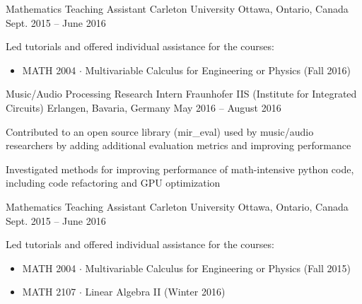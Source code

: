 

\begin{cventries}

    \cventry
      {Mathematics Teaching Assistant} %
      {Carleton University} %
      {Ottawa, Ontario, Canada} %
      {Sept. 2015 – June 2016} %
      {
        \begin{cvitems} %
          \item {Led tutorials and offered individual assistance for the courses:}
            \begin{itemize}
              \item {MATH 2004 $\cdot$ Multivariable Calculus for Engineering or Physics (Fall 2016)}
            \end{itemize}
        \end{cvitems}
      }

  \cventry
    {Music/Audio Processing Research Intern} %
    {Fraunhofer IIS (Institute for Integrated Circuits)} %
    {Erlangen, Bavaria, Germany} %
    {May 2016 – August 2016} %
    {
      \begin{cvitems} %
        \item {Contributed to an open source library (mir\_eval) used by music/audio researchers by adding additional evaluation metrics and improving performance}
        \item {Investigated methods for improving performance of math-intensive python code, including code refactoring and GPU optimization}
      \end{cvitems}
    }

  \cventry
    {Mathematics Teaching Assistant} %
    {Carleton University} %
    {Ottawa, Ontario, Canada} %
    {Sept. 2015 – June 2016} %
    {
      \begin{cvitems} %
        \item {Led tutorials and offered individual assistance for the courses:}
          \begin{itemize}
            \item {MATH 2004 $\cdot$ Multivariable Calculus for Engineering or Physics (Fall 2015)}
            \item {MATH 2107 $\cdot$ Linear Algebra II (Winter 2016)}
          \end{itemize}
      \end{cvitems}
    }


\end{cventries}
